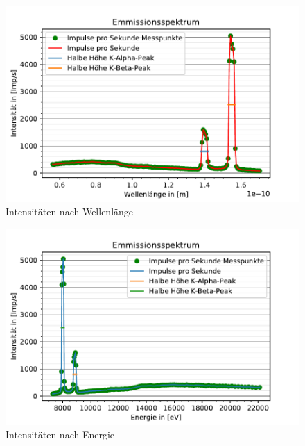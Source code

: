   \begin{figure}
    \centering
    \includegraphics{Emmisionssprktrum.pdf}
    \caption{Intensitäten nach Wellenlänge}
    \label{fig:Emspektrum}
  \end{figure}

  \begin{figure}
    \centering
    \includegraphics{EmmisionssprktrumII.pdf}
    \caption{Intensitäten nach Energie}
    \label{fig:EmspektrumII}
  \end{figure}

